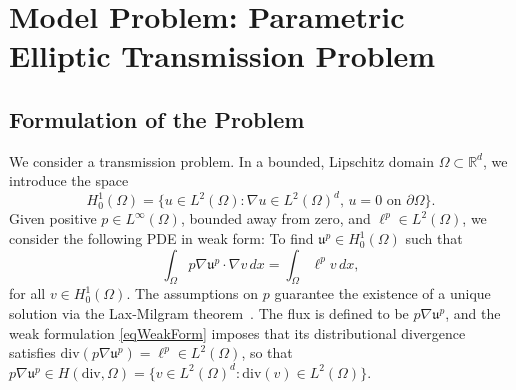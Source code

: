 \documentclass[oneside]{article}
\begin{document}

\section{Model Problem: Parametric Elliptic Transmission Problem}\label{Model Problem}

\subsection{Formulation of the Problem}\label{Formulation of the problem}

\noindent We consider a transmission problem. In a bounded, Lipschitz domain $\Omega\subset\mathbb{R}^d$, we introduce the space 
\begin{equation}
    H^1_0(\Omega)=\{u\in L^2(\Omega):\nabla u\in L^2(\Omega)^d,\, u=0 \text{ on }\partial \Omega\}.
\end{equation}
Given positive $p\in L^\infty(\Omega)$, bounded away from zero, and $\ell^p\in L^2(\Omega)$, we consider the following PDE in weak form: To find $\mathfrak{u}^p\in H^1_0(\Omega)$ such that 
\begin{equation}\label{eqWeakForm}
\int_\Omega p\nabla \mathfrak{u}^p\cdot\nabla v\,dx = \int_\Omega \ell^p v\,dx,
\end{equation}
for all $v\in H^1_0(\Omega)$. The assumptions on $p$ guarantee the existence of a unique solution via the Lax-Milgram theorem~\cite{baharlouei2024least, babuvska1971error, chen2014inf}. The flux is defined to be $p\nabla \mathfrak{u}^p$, and the weak formulation \eqref{eqWeakForm} imposes that its distributional divergence satisfies $\text{div}(p\nabla \mathfrak{u}^p)=\ell^p\in L^2(\Omega)$, so that $p \nabla \mathfrak{u}^p \in H(\text{div},\Omega)=\{v\in L^2(\Omega)^d : \text{div}(v)\in L^2(\Omega)\}$. 
\end{document}
